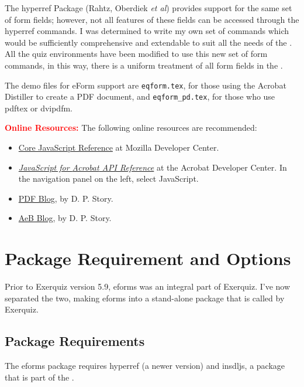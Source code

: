 \documentclass{article}
\let\app\textsf
\def\eForm{\textsf{eForm}}
\begin{document}
The \textsf{hyperref} Package (Rahtz, Oberdiek \textit{et al})
provides support for the same set of form fields; however, not all
features of these fields can be accessed through the
\textsf{hyperref} commands.  I was determined to write my own set
of commands which would be sufficiently comprehensive and
extendable to suit all the needs of the \cAcroB.  All the quiz
environments have been modified to use this new set of form
commands, in this way, there is a uniform treatment of all form
fields in the \cAcroB.

\redpoint The demo files for {\eForm} support are
\texttt{eqform.tex}, for those using the \textsf{\app{Acrobat}
Distiller} to create a PDF document, and \texttt{eqform\_pd.tex},
for those who use \textsf{pdftex} or \textsf{dvipdfm}.

\newtopic\textbf{\textcolor{red}{Online Resources:}} The following online
resources are recommended:
\begin{itemize}
  \item \href{https://developer.mozilla.org/en/JavaScript}{Core JavaScript Reference} at
  Mozilla Developer Center.
  \item \href{http://livedocs.adobe.com/acrobat_sdk/9/Acrobat9_HTMLHelp/wwhelp/wwhimpl/js/html/wwhelp.htm?&accessible=true}
  {\emph{JavaScript for \app{Acrobat} API Reference}} at the \app{Acrobat} Developer Center. In the navigation panel
  on the left, select JavaScript.
  \item \href{\urlAcroTeXBlog/?cat=5}{PDF Blog},
  by D. P. Story.
  \item \href{\urlAcroTeXBlog/?cat=24}{AeB Blog},
  by D. P. Story.
\end{itemize}

\section{Package Requirement and Options}

Prior to \textsf{Exerquiz} version 5.9, \textsf{eforms} was
an integral part of \textsf{Exerquiz}. I've now separated the two, making
\textsf{eforms} into a stand-alone package that is called by
\textsf{Exerquiz}.

\subsection{Package Requirements}

The \textsf{eforms} package requires \textsf{hyperref} (a newer version)
and \textsf{insdljs}, a package that is part of the {\cAcroB}.
\end{document}
